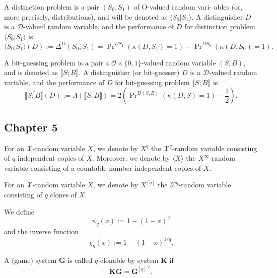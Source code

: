 \documentclass[a4paper,german]{article}
\newenvironment{customdef}[1]{\renewcommand\theinnercustomdef{#1}\innercustomdef}{\endinnercustomdef}
\begin{document}
\begin{customdef}{4.7}
  A distinction problem is a pair $(S_0, S_1)$ of O-valued random vari-
  ables (or, more precisely, distributions), and will be denoted as $\langle S_0 | S_1\rangle$. A distinguisher $D$ is a $\mathcal{D}$-valued random variable, and the performance of $D$ for distinction problem $\langle S_0 | S_1\rangle$ is
  \[
    \overline{\langle S_0 | S_1\rangle}(D) := \Delta^D(S_0, S_1) = \Pr\nolimits^{DS_1}(\kappa(D, S_1)=1) - \Pr\nolimits^{DS_0}(\kappa(D, S_0)=1)
  .\]
\end{customdef}

\begin{customdef}{4.8}
  A bit-guessing problem is a pair a $\mathcal{O} \times \{0, 1\}$-valued random variable $(S, B)$, and is denoted as $\llbracket S; B \rrbracket$. A distinguisher (or bit-guesser) $D$ is a $\mathcal{D}$-valued random variable, and the performance of $D$ for bit-guessing problem $\llbracket S; B \rrbracket$ is
  \[
    \overline{\llbracket S; B \rrbracket}(D) := \Lambda(\llbracket S; B \rrbracket) = 2 \left( \Pr\nolimits^{D(S,B)}(\kappa(D,S) = 1) - \frac{1}{2} \right)
  .\]
\end{customdef}


\subsection*{Chapter 5}

\begin{customdef}{5.1}
  For an $\mathcal{X}$-random variable $X$, we denote by $X^q$ the $\mathcal{X}^q$-random variable consisting of $q$ independent copies of $X$. Moreover, we denote by $\langle X \rangle$ the $X^\infty$-random variable consisting of a countable number independent copies of $X$.
\end{customdef}

\begin{customdef}{5.2}
  For an $\mathcal{X}$-random variable $X$, we denote by $X^{[q]}$ the $\mathcal{X}^q$-random variable consisting of $q$ clones of $X$.
\end{customdef}

\begin{customdef}{5.3}
  We define
  \[
    \psi_q(x) := 1 - (1-x)^q
  \]
  and the inverse function
  \[
    \chi_q(x) := 1-(1-x)^{1/q}
  .\]
\end{customdef}

\begin{customdef}{5.3}
  A (game) system $\mathbf{G}$ is called $q$-clonable by system $\mathbf{K}$ if
  \[
    \mathbf{K}\mathbf{G} = {\mathbf{G}^{[q]}}^\lor
  .\]
\end{customdef}
\end{document}
